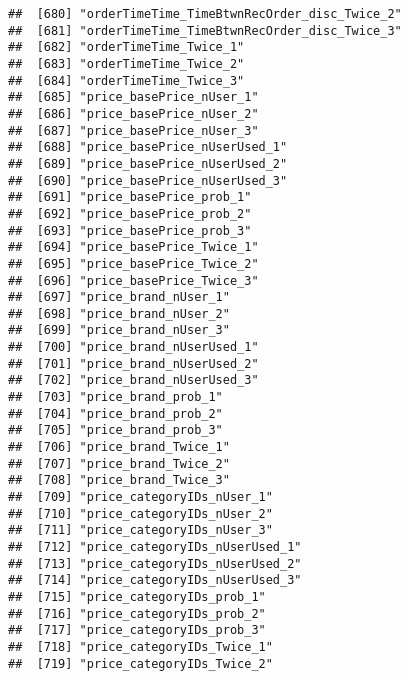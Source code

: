 \documentclass[10pt]{report}
\begin{document}
\begin{verbatim}
##  [680] "orderTimeTime_TimeBtwnRecOrder_disc_Twice_2"          
##  [681] "orderTimeTime_TimeBtwnRecOrder_disc_Twice_3"          
##  [682] "orderTimeTime_Twice_1"                                
##  [683] "orderTimeTime_Twice_2"                                
##  [684] "orderTimeTime_Twice_3"                                
##  [685] "price_basePrice_nUser_1"                              
##  [686] "price_basePrice_nUser_2"                              
##  [687] "price_basePrice_nUser_3"                              
##  [688] "price_basePrice_nUserUsed_1"                          
##  [689] "price_basePrice_nUserUsed_2"                          
##  [690] "price_basePrice_nUserUsed_3"                          
##  [691] "price_basePrice_prob_1"                               
##  [692] "price_basePrice_prob_2"                               
##  [693] "price_basePrice_prob_3"                               
##  [694] "price_basePrice_Twice_1"                              
##  [695] "price_basePrice_Twice_2"                              
##  [696] "price_basePrice_Twice_3"                              
##  [697] "price_brand_nUser_1"                                  
##  [698] "price_brand_nUser_2"                                  
##  [699] "price_brand_nUser_3"                                  
##  [700] "price_brand_nUserUsed_1"                              
##  [701] "price_brand_nUserUsed_2"                              
##  [702] "price_brand_nUserUsed_3"                              
##  [703] "price_brand_prob_1"                                   
##  [704] "price_brand_prob_2"                                   
##  [705] "price_brand_prob_3"                                   
##  [706] "price_brand_Twice_1"                                  
##  [707] "price_brand_Twice_2"                                  
##  [708] "price_brand_Twice_3"                                  
##  [709] "price_categoryIDs_nUser_1"                            
##  [710] "price_categoryIDs_nUser_2"                            
##  [711] "price_categoryIDs_nUser_3"                            
##  [712] "price_categoryIDs_nUserUsed_1"                        
##  [713] "price_categoryIDs_nUserUsed_2"                        
##  [714] "price_categoryIDs_nUserUsed_3"                        
##  [715] "price_categoryIDs_prob_1"                             
##  [716] "price_categoryIDs_prob_2"                             
##  [717] "price_categoryIDs_prob_3"                             
##  [718] "price_categoryIDs_Twice_1"                            
##  [719] "price_categoryIDs_Twice_2"                            

\end{verbatim}
\end{document}
